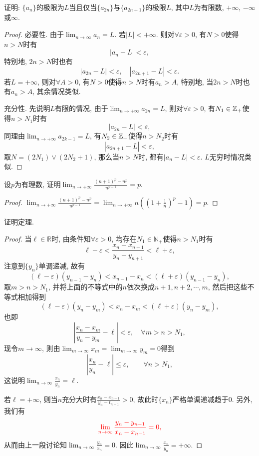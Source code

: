 \begin{quiza}
\woe 证明: \(\{a_n\}\)的极限为\(L\)当且仅当\(\{a_{2n}\}\)与\(\{a_{2n+1}\}\)的极限\(L\), 其中\(L\)为有限数, \(+\infty\), \(-\infty\)或\(\infty\).
\begin{proof}
必要性. 由于\(\lim_{n\rightarrow\infty}a_n=L\). 若\(|L|<+\infty\). 则对\(\forall\varepsilon>0\), 有\(N>0\)使得\(n>N\)时有\[|a_n-L|<\varepsilon,\]特别地, \(2n>N\)时也有\[|a_{2n}-L|<\varepsilon,\quad|a_{2n+1}-L|<\varepsilon.\]若\(L=+\infty\), 则对\(\forall A>0\), 有\(N>0\)使得\(n>N\)时有\(a_n>A\), 特别地, 当\(2n>N\)时也有\(a_n>A\), 其余情况类似. 

充分性. 先说明\(L\)有限的情况, 由于\(\lim_{n\rightarrow+\infty}a_{2n}=L\), 则对\(\forall\varepsilon>0\), 有\(N_1\in\mathbb{Z}_+\)使得\(n>N_1\)时有\[|a_{2n}-L|<\varepsilon,\]同理由\(\lim_{n\rightarrow+\infty}a_{2k-1}=L\), 有\(N_2\in\mathbb{Z}_+\)使得\(n>N_2\)时有\[|a_{2n+1}-L|<\varepsilon,\]取\(N=(2N_1)\vee(2N_2+1)\), 那么当\(n>N\)时, 都有\(|a_n-L|<\varepsilon\). \(L\)无穷时情况类似.
\end{proof}
\woe 设\(p\)为有理数, 证明\(\lim_{n\rightarrow+\infty}\frac{(n+1)^p-n^p}{n^{p-1}}=p\).
\begin{proof}
\(\lim_{n\rightarrow+\infty}\frac{(n+1)^p-n^p}{n^{p-1}}=\lim_{n\rightarrow+\infty}n\left(\left(1+\frac{1}{n}\right)^p-1\right)=p.\)\qedhere
\end{proof}
\woe 证明定理.
\begin{proof}
当\(\ell\in\mathbb{R}\)时, 由条件知\(\forall\varepsilon>0\), 均存在\(N_1\in\mathbb{N}_+\)使得\(n>N_1\)时有\[\ell-\varepsilon<\frac{x_{n}-x_{n+1}}{y_n-y_{n+1}}<\ell+\varepsilon,\]注意到\(\{y_n\}\)单调递减, 故有\[(\ell-\varepsilon)(y_{n-1}-y_n)<x_{n-1}-x_{n}<(\ell+\varepsilon)(y_{n-1}-y_n),\]取\(m>n>N_1\), 并将上面的不等式中的\(n\)依次换成\(n+1,n+2,\cdots,m\), 然后把这些不等式相加得到\[(\ell-\varepsilon)(y_n-y_m)<x_n-x_m<(\ell+\varepsilon)(y_n-y_m),\]也即\[\left|\frac{x_n-x_m}{y_n-y_m}-\ell\right|<\varepsilon,\quad\forall m>n>N_1,\]现令\(m\rightarrow\infty\), 则由\(\lim_{m\rightarrow\infty}x_m=\lim_{m\rightarrow\infty}y_m=0\)得到\[\left|\frac{x_n}{y_n}-\ell\right|\leqslant \varepsilon,\qquad\forall n>N_1,\]这说明\(\lim_{n\rightarrow\infty}\frac{x_n}{y_n}=\ell.\)

若\(\ell=+\infty\), 则当\(n\)充分大时有\(\frac{x_{n}-x_{n-1}}{y_{n}-t_{n-1}}>0\), 故此时\(\{x_n\}\)严格单调递减趋于0. 另外, 我们有\[\textcolor{red}{\lim_{n\rightarrow\infty}\frac{y_n-y_{n-1}}{x_{n}-x_{n-1}}=0,}\]从而由上一段讨论知\(\lim_{n\rightarrow\infty}\frac{y_n}{x_n}=0.\) 因此\(\lim_{n\rightarrow\infty}\frac{x_n}{y_n}=+\infty.\)


\end{proof}
\end{quiza}
